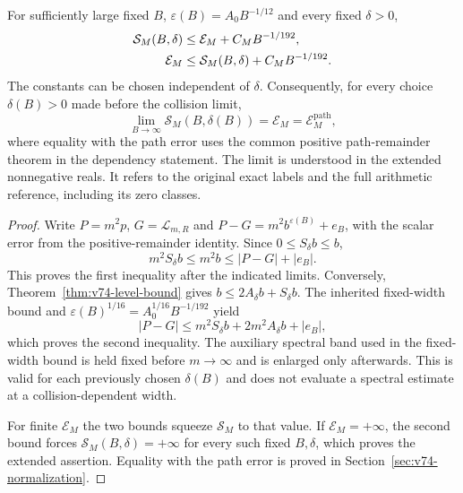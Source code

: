 \begin{theorem}
\label{thm:v74-endpoint-equivalence}
For sufficiently large fixed $B$, $\varepsilon(B)=A_0B^{-1/12}$
and every fixed $\delta>0$,
\begin{align}
 \mathcal S_M(B,\delta)&\le\mathcal E_M+C_MB^{-1/192},\notag\\
 \mathcal E_M&\le\mathcal S_M(B,\delta)+C_MB^{-1/192}.
                                      \label{eq:v74-error-sandwich}
\end{align}
The constants can be chosen independent of $\delta$. Consequently,
for every choice $\delta(B)>0$ made before the collision limit,
\begin{equation}\label{eq:v74-error-limit}
 \lim_{B\to\infty}\mathcal S_M(B,\delta(B))
               =\mathcal E_M=\mathcal E_M^{\mathrm{path}},
\end{equation}
where equality with the path error uses the common positive
path-remainder theorem in the dependency statement. The limit is
understood in the extended nonnegative reals. It refers to the
original exact labels and the full arithmetic reference, including
its zero classes.
\end{theorem}
\begin{proof}
Write $P=m^2p$, $G=\mathcal L_{m,R}$ and
$P-G=m^2b^{\varepsilon(B)}+e_B$, with the scalar error from the
positive-remainder identity. Since $0\le S_\delta b\le b$,
\[
 m^2S_\delta b\le m^2b\le |P-G|+|e_B|.
\]
This proves the first inequality after the indicated limits.
Conversely, Theorem~\ref{thm:v74-level-bound} gives
$b\le2A_\delta b+S_\delta b$. The inherited fixed-width bound
and $\varepsilon(B)^{1/16}=A_0^{1/16}B^{-1/192}$ yield
\[
 |P-G|\le m^2S_\delta b+2m^2A_\delta b+|e_B|,
\]
which proves the second inequality. The auxiliary spectral band
used in the fixed-width bound is held fixed before $m\to\infty$
and is enlarged only afterwards. This is valid for each previously
chosen $\delta(B)$ and does not evaluate a spectral estimate at a
collision-dependent width.

For finite $\mathcal E_M$ the two bounds squeeze
$\mathcal S_M$ to that value. If $\mathcal E_M=+\infty$, the second
bound forces $\mathcal S_M(B,\delta)=+\infty$ for every such fixed
$B,\delta$, which proves the extended assertion. Equality with the
path error is proved in Section~\ref{sec:v74-normalization}.
\end{proof}

